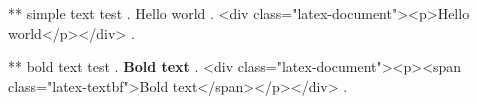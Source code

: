 ** simple text test
.
Hello world
.
<div class="latex-document"><p>Hello world</p></div>
.


** bold text test
.
\textbf{Bold text}
.
<div class="latex-document"><p><span class="latex-textbf">Bold text</span></p></div>
.
